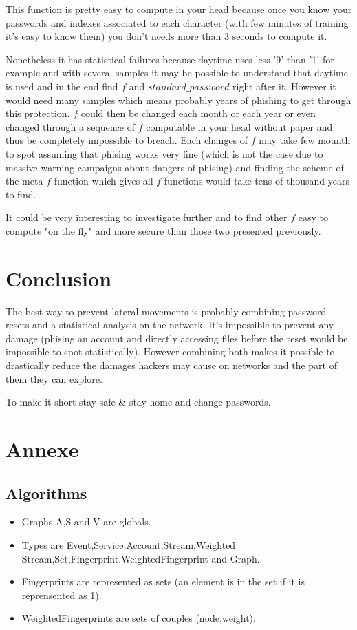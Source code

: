 \documentclass[11pt]{article}
\begin{document}
This function is pretty easy to compute in your head because once you know your passwords and indexes associated to each character (with few minutes of training it's easy to know them) you don't needs more than 3 seconds to compute it.

Nonetheless it has statistical failures because daytime uses less '9' than '1' for example and with several samples it may be possible to understand that daytime is used and in the end find $f$ and $standard\_password$ right after it. However it would need many samples which means probably years of phishing to get through this protection. $f$ could then be changed each month or each year or even changed through a sequence of $f$ computable in your head without paper and thus be completely impossible to breach. Each changes of $f$ may take few mounth to spot assuming that phising works very fine (which is not the case due to massive warning campaigns about dangers of phising) and finding the scheme of the meta-$f$ function which gives all $f$ functions would take tens of thousand years to find.

It could be very interesting to investigate further and to find other $f$ easy to compute "on the fly" and more secure than those two presented previously.

\section{Conclusion}
The best way to prevent lateral movements is probably combining password resets and a statistical analysis on the network. It's impossible to prevent any damage (phising an account and directly accessing files before the reset would be impossible to spot statistically). However combining both makes it possible to drastically reduce the damages hackers may cause on networks and the part of them they can explore. 

To make it short stay safe \& stay home and change passwords.




\newpage
\section{Annexe}
\subsection{Algorithms}
\begin{itemize}
\item Graphs A,S and V are globals. 

\item Types are Event,Service,Account,Stream,Weighted Stream,Set,Fingerprint,WeightedFingerprint and Graph.

\item Fingerprints are represented as sets (an element is in the set if it is reprensented as 1). 

\item WeightedFingerprints are sets of couples (node,weight).

\end{itemize}
\end{document}
